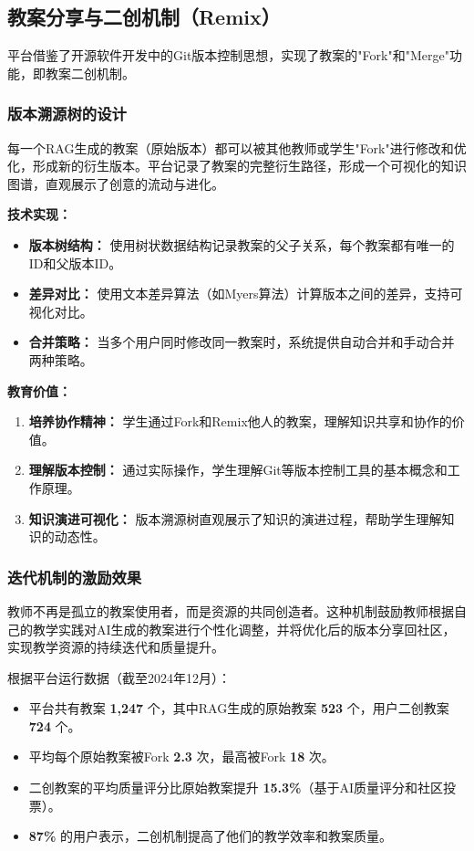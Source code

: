 \documentclass[12pt,a4paper,fontset=fandol]{ctexart}
\begin{document}
\subsection{教案分享与二创机制（Remix）}
平台借鉴了开源软件开发中的Git版本控制思想，实现了教案的"Fork"和"Merge"功能，即教案二创机制。

\subsubsection{版本溯源树的设计}
每一个RAG生成的教案（原始版本）都可以被其他教师或学生"Fork"进行修改和优化，形成新的衍生版本。平台记录了教案的完整衍生路径，形成一个可视化的知识图谱，直观展示了创意的流动与进化。

\textbf{技术实现：}
\begin{itemize}
    \item \textbf{版本树结构：} 使用树状数据结构记录教案的父子关系，每个教案都有唯一的ID和父版本ID。
    \item \textbf{差异对比：} 使用文本差异算法（如Myers算法）计算版本之间的差异，支持可视化对比。
    \item \textbf{合并策略：} 当多个用户同时修改同一教案时，系统提供自动合并和手动合并两种策略。
\end{itemize}

\textbf{教育价值：}
\begin{enumerate}
    \item \textbf{培养协作精神：} 学生通过Fork和Remix他人的教案，理解知识共享和协作的价值。
    \item \textbf{理解版本控制：} 通过实际操作，学生理解Git等版本控制工具的基本概念和工作原理。
    \item \textbf{知识演进可视化：} 版本溯源树直观展示了知识的演进过程，帮助学生理解知识的动态性。
\end{enumerate}

\subsubsection{迭代机制的激励效果}
教师不再是孤立的教案使用者，而是资源的共同创造者。这种机制鼓励教师根据自己的教学实践对AI生成的教案进行个性化调整，并将优化后的版本分享回社区，实现教学资源的持续迭代和质量提升。

根据平台运行数据（截至2024年12月）：
\begin{itemize}
    \item 平台共有教案 \textbf{1,247} 个，其中RAG生成的原始教案 \textbf{523} 个，用户二创教案 \textbf{724} 个。
    \item 平均每个原始教案被Fork \textbf{2.3} 次，最高被Fork \textbf{18} 次。
    \item 二创教案的平均质量评分比原始教案提升 \textbf{15.3\%}（基于AI质量评分和社区投票）。
    \item \textbf{87\%} 的用户表示，二创机制提高了他们的教学效率和教案质量。
\end{itemize}
\end{document}

